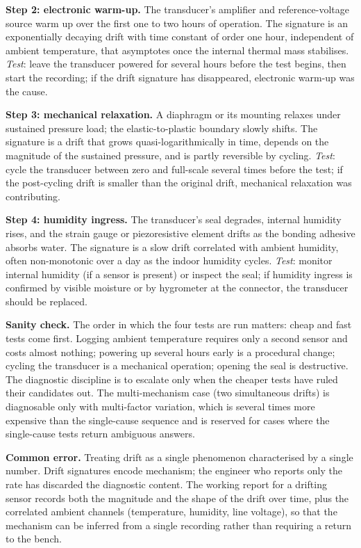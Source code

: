 \textbf{Step 2: electronic warm-up.} The transducer's amplifier
and reference-voltage source warm up over the first one to two
hours of operation. The signature is an exponentially decaying
drift with time constant of order one hour, independent of ambient
temperature, that asymptotes once the internal thermal mass
stabilises.
\emph{Test}: leave the transducer powered for several hours before
the test begins, then start the recording; if the drift signature
has disappeared, electronic warm-up was the cause.

\textbf{Step 3: mechanical relaxation.} A diaphragm or its mounting
relaxes under sustained pressure load; the elastic-to-plastic
boundary slowly shifts. The signature is a drift that grows
quasi-logarithmically in time, depends on the magnitude of the
sustained pressure, and is partly reversible by cycling.
\emph{Test}: cycle the transducer between zero and full-scale
several times before the test; if the post-cycling drift is
smaller than the original drift, mechanical relaxation was
contributing.

\textbf{Step 4: humidity ingress.} The transducer's seal degrades,
internal humidity rises, and the strain gauge or piezoresistive
element drifts as the bonding adhesive absorbs water. The
signature is a slow drift correlated with ambient humidity, often
non-monotonic over a day as the indoor humidity cycles.
\emph{Test}: monitor internal humidity (if a sensor is present)
or inspect the seal; if humidity ingress is confirmed by visible
moisture or by hygrometer at the connector, the transducer
should be replaced.

\textbf{Sanity check.} The order in which the four tests are run
matters: cheap and fast tests come first. Logging ambient
temperature requires only a second sensor and costs almost
nothing; powering up several hours early is a procedural change;
cycling the transducer is a mechanical operation; opening the
seal is destructive. The diagnostic discipline is to escalate
only when the cheaper tests have ruled their candidates out. The
multi-mechanism case (two simultaneous drifts) is diagnosable
only with multi-factor variation, which is several times more
expensive than the single-cause sequence and is reserved for cases
where the single-cause tests return ambiguous answers.

\textbf{Common error.} Treating drift as a single phenomenon
characterised by a single number. Drift signatures encode
mechanism; the engineer who reports only the rate has discarded
the diagnostic content. The working report for a drifting sensor
records both the magnitude and the shape of the drift over time,
plus the correlated ambient channels (temperature, humidity, line
voltage), so that the mechanism can be inferred from a single
recording rather than requiring a return to the bench.

